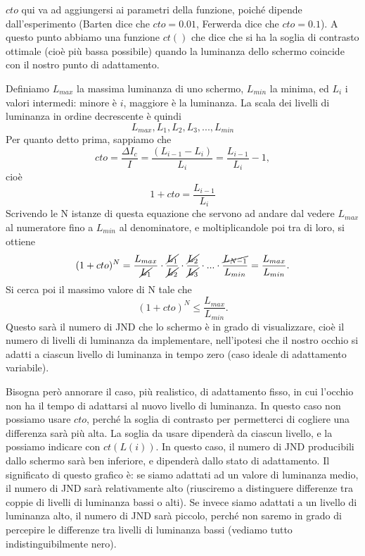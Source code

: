 \documentclass[a4paper,11pt]{article}
\begin{document}
$cto$ qui va ad aggiungersi ai parametri della funzione, poiché dipende dall'esperimento (Barten dice che $cto = 0.01$, Ferwerda dice che $cto = 0.1$). A questo punto abbiamo una funzione
$ct()$ che dice che si ha la soglia di contrasto ottimale (cioè più bassa possibile) quando la luminanza dello schermo coincide con il nostro punto di adattamento.
\par
Definiamo $L_{max}$ la massima luminanza di uno schermo, $L_{min}$ la minima, ed $L_i$ i valori intermedi: minore è $i$, maggiore
è la luminanza. La scala dei livelli di luminanza in ordine decrescente è quindi
\[L_{max}, L_1, L_2, L_3, ..., L_{min}\]
Per quanto detto prima, sappiamo che
\[
cto = \frac{\Delta I_c}{I}  = \frac{(L_{i-1}-L_i)}{L_i}
= \frac{L_{i-1}}{L_i} - 1,
\]
cioè
\[1+cto = \frac{L_{i-1}}{L_i}\]
Scrivendo le N istanze di questa equazione che servono ad andare dal vedere $L_{max}$ al numeratore fino a $L_{min}$ al denominatore, e moltiplicandole poi tra di loro, si ottiene
\[
(1+cto)^N = \frac{L_{max}}{\cancel{L_1}}\cdot \frac{\cancel{L_1}}{\cancel{L_2}} \cdot
\frac{\cancel{L_2}}{\cancel{L_3}} \cdot ... \cdot \frac{\cancel{L_{N-1}}}{L_{min}} = \frac{L_{max}}{L_{min}}.
\]
Si cerca poi il massimo valore di N tale che
\[
(1+cto)^N \leq \frac{L_{max}}{L_{min}}.
\]
Questo sarà il numero di JND che lo schermo è in grado di visualizzare, cioè il numero di livelli di luminanza da implementare, nell'ipotesi che il nostro occhio si adatti
a ciascun livello di luminanza in tempo zero (caso ideale di adattamento variabile).
\par
Bisogna però annorare il caso, più realistico, di adattamento fisso, in cui l'occhio non ha il tempo di adattarsi al nuovo livello
di luminanza. In questo caso non possiamo usare $cto$, perché la soglia di contrasto per permetterci di cogliere una differenza
sarà più alta. La soglia da usare dipenderà da ciascun livello, e la possiamo indicare con $ct(L(i))$.
In questo caso, il numero di JND producibili dallo schermo sarà ben inferiore, e dipenderà dallo stato di adattamento. Il significato di questo grafico è: se siamo adattati ad un valore di luminanza
medio, il numero di JND sarà relativamente alto (riusciremo a distinguere differenze tra coppie di livelli di luminanza bassi o alti). Se invece siamo adattati a un livello di luminanza alto,
il numero di JND sarà piccolo, perché non saremo in grado di percepire le differenze tra livelli di luminanza bassi (vediamo tutto indistinguibilmente nero).
\end{document}
